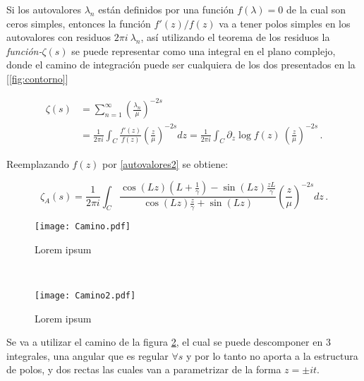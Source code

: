 Si los  autovalores $\lambda _n$ están definidos por una función $f( \lambda  ) = 0$ de la cual son ceros simples, entonces la función $f'(z) / f(z) $ va a tener polos simples en los autovalores con residuos $2 \pi i \ \lambda _n$, así utilizando el teorema de los residuos la  {\it función-$\zeta (s)$} se puede representar como una integral en el plano complejo, donde el camino de integración puede ser cualquiera de los dos presentados en la [\ref{fig:contorno}]

\begin{equation}
\begin{aligned}
   \zeta  (s) &=  \sum _{n=1} ^{\infty} \left( \frac{\lambda _n}{\mu} \right) ^{-2s} \\[5pt] &=  
   \frac{1}{2 \pi i} \int _{C} \frac{f'(z)}{f(z)} \left( \frac{z}{\mu} \right) ^{-2s} dz 
   =  \frac{1}{2 \pi i} \int _{C} \partial _z \log f(z) \ 
	   \left( \frac{z}{\mu} \right) ^{-2s} \, .
\end{aligned}
\label{asd}
\end{equation}

Reemplazando $f(z)$ por  \ref{autovalores2} se obtiene:

\begin{equation}
	\zeta _A (s) = 
    \frac{1}{2 \pi i} \int _{C}
    \frac{ \cos (L z) \left(L + \frac{1}{\gamma} \right) - \sin(L z) \frac{z L}{\gamma}
    }
    { \cos(L z) \frac{z}{\gamma} + \sin(L z)
    }
    \left( \frac{z}{\mu} \right) ^{-2 s} dz  \, .
\end{equation}


\begin{figure*}[t!]
    \centering
    \begin{subfigure}[t]{0.5\textwidth}
        \centering
        \texttt{[image: Camino.pdf]}
        \caption{Lorem ipsum}
        \label{fig.izquierda}
    \end{subfigure}%
    ~ 
    \begin{subfigure}[t]{0.5\textwidth}
        \centering
        \texttt{[image: Camino2.pdf]}
        \caption{Lorem ipsum}
        \label{fig.derecha}
    \end{subfigure}
    \caption{Camino tenido en cuenta para realizar la integral de contorno en el plano complejo}
\label{fig:contorno}
\end{figure*}


Se va a utilizar el camino de la figura \ref{fig.derecha}, el cual se puede descomponer en 3 integrales, una angular que es regular $ \forall s$ y por lo tanto no aporta a la estructura de polos, y dos rectas las cuales van a parametrizar de la forma $z = \pm i  t$. 

